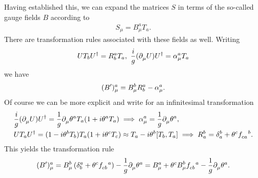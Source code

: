 Having established this, we can expand the matrices $S$ in terms of the so-called gauge fields $B$ according to
\begin{align*}
S_{\mu} = B_{\mu}^{a}T_{a}.
\end{align*}
There are transformation rules associated with these fields as well. Writing
\begin{align*}
UT_{b}U^{\dagger} = R_{b}^{a}T_{a},\ \frac{i}{g}(\partial^{}_{\mu}U)U^{\dagger} = \alpha^{a}_{\mu}T_{a}
\end{align*}
we have
\begin{align*}
(B^{\prime})_{\mu}^{a} = B_{\mu}^{b}R_{b}^{a} - \alpha^{a}_{\mu}.
\end{align*}
Of course we can be more explicit and write for an infinitesimal transformation
\begin{align*}
&\frac{i}{g}(\del{}{\mu}U)U\adj = \frac{1}{g}\del{}{\mu}\theta^{a}T_{a}(1 + i\theta^{a}T_{a}) \implies \alpha^{a}_{\mu} = \frac{1}{g}\del{}{\mu}\theta^{a}, \\
&UT_{a}U\adj = (1 - i\theta^{b}T_{b})T_{a}(1 + i\theta^{c}T_{c}) \approx T_{a} - i\theta^{b}\comm{T_{b}}{T_{a}} \implies R_{a}^{b} = \kdelta{b}{a} + \theta^{c}\srconst{ca}{b}.
\end{align*}
This yields the transformation rule
\begin{align*}
(B\p)_{\mu}^{a} = B_{\mu}^{b}\left(\kdelta{a}{b} + \theta^{c}\srconst{cb}{a}\right) - \frac{1}{g}\del{}{\mu}\theta^{a} = B_{\mu}^{a} + \theta^{c}B_{\mu}^{b}\srconst{cb}{a} - \frac{1}{g}\del{}{\mu}\theta^{a}.
\end{align*}


